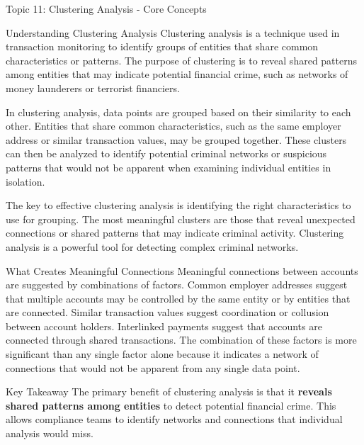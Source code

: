 \documentclass[5pt]{beamer}
\begin{document}
	\begin{frame}{Topic 11: Clustering Analysis - Core Concepts}
		\begin{block}{\tiny Understanding Clustering Analysis}
			\tiny Clustering analysis is a technique used in transaction monitoring to identify groups of entities that share common characteristics or patterns. The purpose of clustering is to reveal shared patterns among entities that may indicate potential financial crime, such as networks of money launderers or terrorist financiers.
			
			In clustering analysis, data points are grouped based on their similarity to each other. Entities that share common characteristics, such as the same employer address or similar transaction values, may be grouped together. These clusters can then be analyzed to identify potential criminal networks or suspicious patterns that would not be apparent when examining individual entities in isolation.
			
			The key to effective clustering analysis is identifying the right characteristics to use for grouping. The most meaningful clusters are those that reveal unexpected connections or shared patterns that may indicate criminal activity. Clustering analysis is a powerful tool for detecting complex criminal networks.
		\end{block}
		
		\begin{block}{\tiny What Creates Meaningful Connections}
			\tiny Meaningful connections between accounts are suggested by combinations of factors. Common employer addresses suggest that multiple accounts may be controlled by the same entity or by entities that are connected. Similar transaction values suggest coordination or collusion between account holders. Interlinked payments suggest that accounts are connected through shared transactions. The combination of these factors is more significant than any single factor alone because it indicates a network of connections that would not be apparent from any single data point.
		\end{block}
		
		\begin{alertblock}{Key Takeaway}
			\tiny The primary benefit of clustering analysis is that it \textbf{reveals shared patterns among entities} to detect potential financial crime. This allows compliance teams to identify networks and connections that individual analysis would miss.
		\end{alertblock}
	\end{frame}
	
\end{document}
